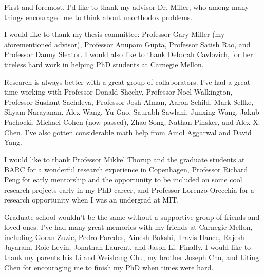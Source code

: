 \documentclass[12pt]{cmuthesis}
\begin{document}
\begin{acknowledgments}
  First and foremost, I'd like to thank my advisor Dr. Miller, who among
  many things encouraged me to think about unorthodox problems. 

I would like to thank my thesis committee: Professor Gary Miller (my aforementioned
    advisor), Professor Anupam Gupta, Professor Satish
    Rao, and Professor Danny Sleator. I would also like to thank Deborah
    Cavlovich, for her tireless hard work in helping PhD students at
    Carnegie Mellon.


  Research is always better with a great group of collaborators. I've
  had a great time working with Professor Donald Sheehy, Professor Noel
  Walkington, Professor Sushant Sachdeva, Professor Josh Alman, Aaron
  Schild, Mark Sellke, Shyam Narayanan, Alex Wang, Yu Gao,
  Saurabh Sawlani, Junxing Wang, Jakub Pachocki, Michael Cohen (now
  passed), Zhao Song, Nathan Pinsker, and Alex X. Chen. I've also gotten
  considerable math help from Amol Aggarwal and David Yang.  

  I would like
  to thank Professor Mikkel Thorup and the graduate students at BARC for
  a wonderful research experience in Copenhagen, Professor Richard Peng
  for early mentorship and the opportunity to be included on some cool research projects early
  in my PhD career, and Professor Lorenzo
  Orecchia for a research opportunity when I was an undergrad at
  MIT. 

  Graduate school wouldn't be the same without a supportive group of
  friends and loved ones. I've had many great memories with my friends
  at Carnegie Mellon, including Goran Zuzic, Pedro Paredes, Ainesh
  Bakshi, Travis Hance, Rajesh Jayaram, Roie Levin, Jonathan Laurent,
  and Jason Li.  Finally, I would like to thank my parents Iris Li and Weishang Chu,
  my brother Joseph Chu, and Liting Chen for encouraging me to finish my PhD when
  times were hard. 

\end{acknowledgments}

\tableofcontents
\listoffigures
\listoftables

\mainmatter


%
%
%
%
%
\end{document}
